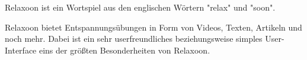 \begin{spacing}{1}
    
    Relaxoon ist ein Wortspiel aus den englischen Wörtern "relax" und "soon". 

    Relaxoon bietet Entspannungsübungen in Form von Videos, Texten, Artikeln und noch mehr. 
    Dabei ist ein sehr userfreundliches beziehungsweise simples User-Interface eins der größten Besonderheiten von Relaxoon.

\end{spacing}